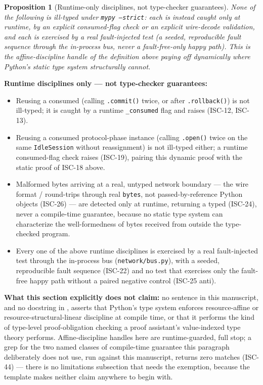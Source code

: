 \documentclass[
  english,
]{article}
\providecommand{\tightlist}{%
  \setlength{\itemsep}{0pt}\setlength{\parskip}{0pt}}
\newtheorem{proposition}[theorem]{Proposition}
\theoremstyle{definition}
\begin{document}
\begin{proposition}[Runtime-only disciplines, not type-checker guarantees]
None of the following is ill-typed under \texttt{mypy --strict}: each is instead caught only at
runtime, by an explicit consumed-flag check or an explicit wire-decode validation, and each is
exercised by a real fault-injected test (a seeded, reproducible fault sequence through the in-process
bus, never a fault-free-only happy path). This is the affine-discipline handle of the definition
above paying off dynamically where Python's static type system structurally cannot.
\end{proposition}

\textbf{Runtime disciplines only --- not type-checker guarantees:}

\begin{itemize}
\tightlist
\item
  Reusing a consumed  (calling
  \texttt{.commit()} twice, or after \texttt{.rollback()}) is not
  ill-typed; it is caught by a runtime \texttt{\_consumed} flag and
  raises  (ISC-12, ISC-13).
\item
  Reusing a consumed protocol-phase instance (calling \texttt{.open()}
  twice on the same \texttt{IdleSession} without reassignment) is not
  ill-typed either; a runtime consumed-flag check raises
   (ISC-19), pairing this dynamic proof
  with the static proof of ISC-18 above.
\item
  Malformed bytes arriving at a real, untyped network boundary --- the
  wire format
  /
  round-trips through real \texttt{bytes}, not passed-by-reference
  Python objects (ISC-26) --- are detected only at runtime, returning a
  typed  (ISC-24), never a
  compile-time guarantee, because no static type system can characterize
  the well-formedness of bytes received from outside the type-checked
  program.
\item
  Every one of the above runtime disciplines is exercised by a real
  fault-injected test through the in-process bus
  (\texttt{network/bus.py}), with a seeded, reproducible fault sequence
  (ISC-22) and no test that exercises only the fault-free happy path
  without a paired negative control (ISC-25 anti).
\end{itemize}

\textbf{What this section explicitly does not claim:} no sentence in
this manuscript, and no docstring in ,
asserts that Python's type system enforces resource-affine or
resource-structural-linear discipline at compile time, or that it
performs the kind of type-level proof-obligation checking a proof
assistant's value-indexed type theory performs. Affine-discipline
handles here are runtime-guarded, full stop; a grep for the two named
classes of compile-time guarantee this paragraph deliberately does not
use, run against this manuscript, returns zero matches (ISC-44) ---
there is no limitations subsection that needs the exemption, because the
template makes neither claim anywhere to begin with.
\end{document}
